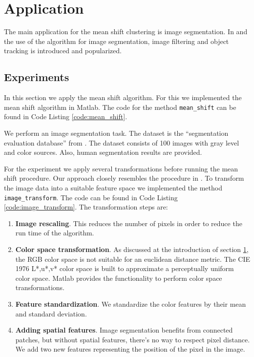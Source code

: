 \documentclass{article}
\begin{document}
\section{Application} \label{sec:application}

The main application for the mean shift clustering is image segmentation. In \cite{Comaniciu.2002} and \cite{Comaniciu.2003} the use of the algorithm for image segmentation, image filtering and object tracking is introduced and popularized.

\subsection{Experiments}

In this section we apply the mean shift algorithm. For this we implemented the mean shift algorithm in Matlab. The code for the method \texttt{mean\_shift} can be found in Code Listing \ref{code:mean_shift}.

We perform an image segmentation task. The dataset is the ``segmentation evaluation database'' from \cite{Alpert.2012}. The dataset consists of 100 images with gray level and color sources. Also, human segmentation results are provided.

For the experiment we apply several transformations before running the mean shift procedure. Our approach closely resembles the procedure in \cite{Comaniciu.2002}. To transform the image data into a suitable feature space we implemented the method \texttt{image\_transform}. The code can be found in Code Listing \ref{code:image_transform}. The transformation steps are:

\begin{enumerate}
	\item \textbf{Image rescaling}. This reduces the number of pixels in order to reduce the run time of the algorithm.
	\item \textbf{Color space transformation}. As discussed at the introduction of section \ref{sec:application}, the RGB color space is not suitable for an euclidean distance metric. The CIE 1976 L*,u*,v* color space is built to approximate a perceptually uniform color space. Matlab provides the functionality to perform color space transformations.
	\item \textbf{Feature standardization}. We standardize the color features by their mean and standard deviation.
	\item \textbf{Adding spatial features}. Image segmentation benefits from connected patches, but without spatial features, there's no way to respect pixel distance. We add two new features representing the position of the pixel in the image.
\end{enumerate}
\end{document}
